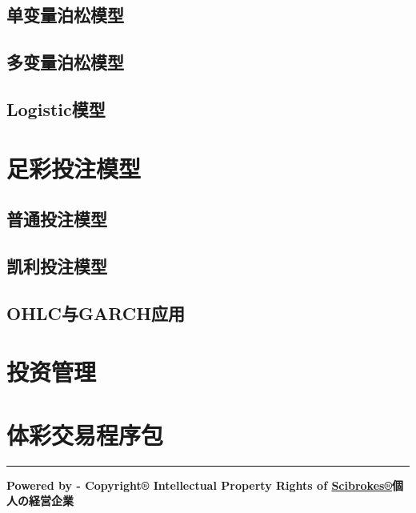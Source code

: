 \documentclass[]{book}
\theoremstyle{definition}
\theoremstyle{definition}
\theoremstyle{definition}
\theoremstyle{remark}
\begin{document}
\subsection{单变量泊松模型}

\subsection{多变量泊松模型}

\subsection{Logistic模型}\label{logistic}

\subsection{}\label{section-1}

\section{足彩投注模型}

\subsection{普通投注模型}

\subsection{凯利投注模型}

\subsection{OHLC与GARCH应用}\label{ohlcgarch}

\section{投资管理}\label{-1}

\section{体彩交易程序包}

\begin{center}\rule{0.5\linewidth}{\linethickness}\end{center}

\textbf{Powered by - Copyright® Intellectual Property Rights of
\href{http://www.scibrokes.com}{Scibrokes®}個人の経営企業}
\end{document}
